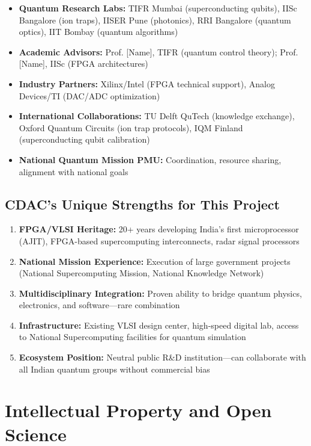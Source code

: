 \documentclass[12pt,a4paper]{article}
\begin{document}
\begin{enumerate}[leftmargin=*]
\begin{itemize}[leftmargin=*]
    \item \textbf{Quantum Research Labs:} TIFR Mumbai (superconducting qubits), IISc Bangalore (ion traps), IISER Pune (photonics), RRI Bangalore (quantum optics), IIT Bombay (quantum algorithms)
    \item \textbf{Academic Advisors:} Prof. [Name], TIFR (quantum control theory); Prof. [Name], IISc (FPGA architectures)
    \item \textbf{Industry Partners:} Xilinx/Intel (FPGA technical support), Analog Devices/TI (DAC/ADC optimization)
    \item \textbf{International Collaborations:} TU Delft QuTech (knowledge exchange), Oxford Quantum Circuits (ion trap protocols), IQM Finland (superconducting qubit calibration)
    \item \textbf{National Quantum Mission PMU:} Coordination, resource sharing, alignment with national goals
\end{itemize}

\subsection{CDAC's Unique Strengths for This Project}

\begin{enumerate}[leftmargin=*]
    \item \textbf{FPGA/VLSI Heritage:} 20+ years developing India's first microprocessor (AJIT), FPGA-based supercomputing interconnects, radar signal processors
    \item \textbf{National Mission Experience:} Execution of large government projects (National Supercomputing Mission, National Knowledge Network)
    \item \textbf{Multidisciplinary Integration:} Proven ability to bridge quantum physics, electronics, and software—rare combination
    \item \textbf{Infrastructure:} Existing VLSI design center, high-speed digital lab, access to National Supercomputing facilities for quantum simulation
    \item \textbf{Ecosystem Position:} Neutral public R\&D institution—can collaborate with all Indian quantum groups without commercial bias
\end{enumerate}

\newpage

\section{Intellectual Property and Open Science}


\end{enumerate}
\end{document}
